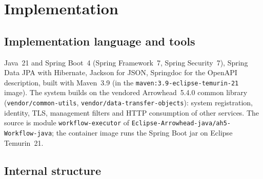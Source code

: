\documentclass[a4paper]{arrowhead}
\begin{document}
\newpage
\section{Implementation}
\label{sec:implementation}

\subsection{Implementation language and tools}
Java~21 and Spring Boot~4 (Spring Framework~7, Spring Security~7), Spring Data JPA with Hibernate, Jackson for JSON,
Springdoc for the OpenAPI description, built with Maven~3.9 (in the \texttt{maven:3.\allowbreak{}9-\allowbreak{}eclipse-\allowbreak{}temurin-\allowbreak{}21} image). The
system builds on the vendored Arrowhead~5.4.0 common library (\texttt{vendor/\allowbreak{}common-\allowbreak{}utils},
\texttt{vendor/\allowbreak{}data-\allowbreak{}transfer-\allowbreak{}objects}): system registration, identity, TLS, management filters and HTTP consumption
of other services. The source is module \texttt{workflow-\allowbreak{}executor} of \texttt{Eclipse-\allowbreak{}Arrowhead-\allowbreak{}java/\allowbreak{}ah5-\allowbreak{}Workflow-\allowbreak{}java}; the
container image runs the Spring Boot jar on Eclipse Temurin~21.

\subsection{Internal structure}
\end{document}
